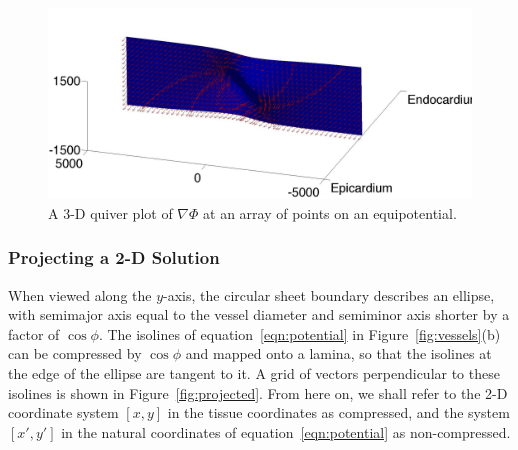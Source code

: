     \begin{figure}[htbp]
      \centering
      \includegraphics[width=1\textwidth]{Ch4/Figs/del_phi}
      \caption{A 3-D quiver plot of $\nabla\Phi$ at an array of points on an equipotential.}
      \label{fig:del_phi}
    \end{figure}
  
  \subsubsection{Projecting a 2-D Solution} %
  \label{sub:projecting_a_2_d_solution}
    When viewed along the $y$-axis, the circular sheet boundary describes an ellipse, with semimajor axis equal to the vessel diameter and semiminor axis shorter by a factor of $\cos \phi$. The isolines of equation~\ref{eqn:potential} in Figure~\ref{fig:vessels}(b) can be compressed by $\cos \phi$ and mapped onto a lamina, so that the isolines at the edge of the ellipse are tangent to it. A grid of vectors perpendicular to these isolines is shown in Figure~\ref{fig:projected}. From here on, we shall refer to the 2-D coordinate system $\left[ x, y \right]$ in the tissue coordinates as compressed, and the system $\left[ x', y' \right]$ in the natural coordinates of equation~\ref{eqn:potential} as non-compressed.
    
